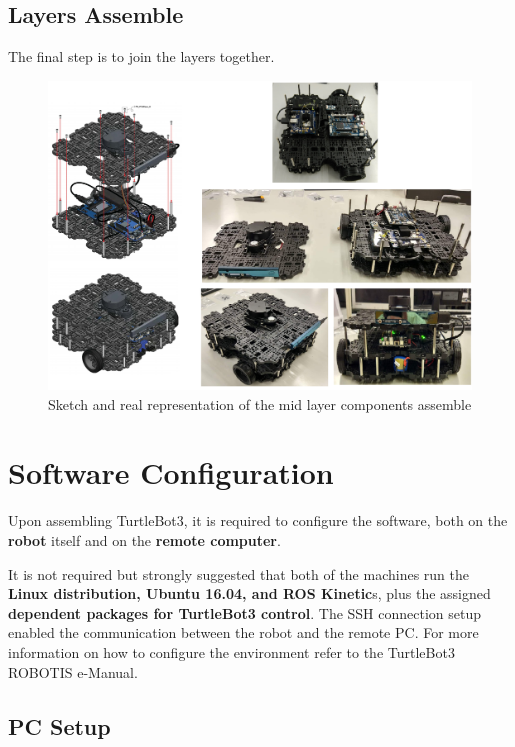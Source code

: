\documentclass{article}
\begin{document}
 \newpage
 
 \subsection{Layers Assemble}
 
 The final step is to join the layers together. 
 
    \begin{figure}[h]
 \centering
 \includegraphics[width=1.1\textwidth,height=0.6\textheight]{finalasm.png}
 \caption{Sketch and real representation of the mid layer components assemble}
 \end{figure}
 
 \newpage
 
 \section{Software Configuration}
 
 Upon assembling TurtleBot3, it is required to configure the software, both on the \textbf{robot} itself and on the \textbf{remote computer}. 
 
 It is not required but strongly suggested that both of the machines run the \textbf{Linux distribution, Ubuntu 16.04, and ROS Kinetic}s, plus the assigned \textbf{dependent packages for TurtleBot3 control}. The SSH connection setup enabled the communication between the robot and the remote PC. For more information on how to configure the environment refer to the TurtleBot3 ROBOTIS e-Manual.

\subsection{PC Setup}
\end{document}
